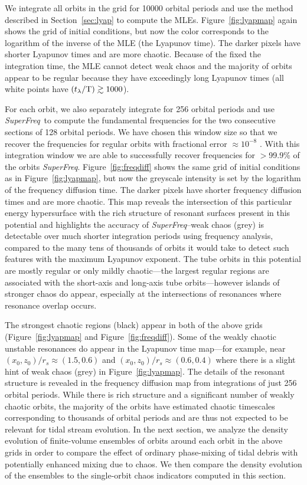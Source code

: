\documentclass[letterpaper,12pt,preprint]{aastex}
\newcommand{\periods}{\ensuremath{{\rm T}}}
\newcommand{\project}[1]{\textsl{#1}}
\newcommand{\superfreq}{\project{SuperFreq}}
\begin{document}
We integrate all orbits in the grid for 10000 orbital periods and use the method described in Section~\ref{sec:lyap} to compute the MLEs. Figure~\ref{fig:lyapmap} again shows the grid of initial conditions, but now the color corresponds to the logarithm of the inverse of the MLE (the Lyapunov time). The darker pixels have shorter Lyapunov times and are more chaotic. Because of the fixed the integration time, the MLE cannot detect weak chaos and the majority of orbits appear to be regular because they have exceedingly long Lyapunov times (all white points have $(t_\lambda/\periods) \gtrsim 1000$). 

For each orbit, we also separately integrate for 256 orbital periods and use \superfreq\ to compute the fundamental frequencies for the two consecutive sections of 128 orbital periods. We have chosen this window size so that we recover the frequencies for regular orbits with fractional error $\approx10^{-8}$ \citep[we estimate the error in frequency recovery using the method described in][]{laskar93}. With this integration window we are able to successfully recover frequencies for $>$99.9\% of the orbits \superfreq. Figure~\ref{fig:freqdiff} shows the same grid of initial conditions as in Figure~\ref{fig:lyapmap}, but now the greyscale intensity is set by the logarithm of the frequency diffusion time. The darker pixels have shorter frequency diffusion times and are more chaotic. This map reveals the intersection of this particular energy hypersurface with the rich structure of resonant surfaces present in this potential and highlights the accuracy of \superfreq\---weak chaos (grey) is detectable over much shorter integration periods using frequency analysis, compared to the many tens of thousands of orbits it would take to detect such features with the maximum Lyapunov exponent. The tube orbits in this potential are mostly regular or only mildly chaotic---the largest regular regions are associated with the short-axis and long-axis tube orbits---however islands of stronger chaos do appear, especially at the intersections of resonances where resonance overlap occurs. 

The strongest chaotic regions (black) appear in both of the above grids (Figure~\ref{fig:lyapmap} and Figure~\ref{fig:freqdiff}). Some of the weakly chaotic unstable resonances do appear in the Lyapunov time map---for example, near $(x_0,z_0) / r_s \approx(1.5,0.6)$ and $(x_0,z_0) /r_s \approx(0.6,0.4)$ where there is a slight hint of weak chaos (grey) in Figure~\ref{fig:lyapmap}. The details of the resonant structure is revealed in the frequency diffusion map from integrations of just 256 orbital periods. While there is rich structure and a significant number of weakly chaotic orbits, the majority of the orbits have estimated chaotic timescales corresponding to thousands of orbital periods and are thus not expected to be relevant for tidal stream evolution. In the next section, we analyze the density evolution of finite-volume ensembles of orbits around each orbit in the above grids in order to compare the effect of ordinary phase-mixing of tidal debris with potentially enhanced mixing due to chaos. We then compare the density evolution of the ensembles to the single-orbit chaos indicators computed in this section.
\end{document}

